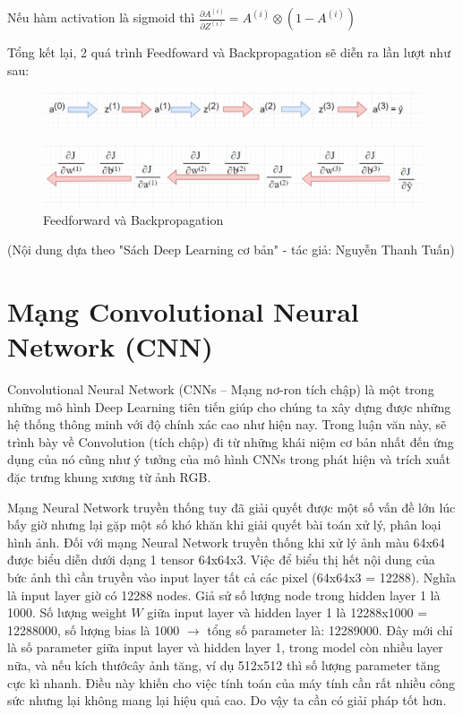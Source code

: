 Nếu hàm activation là sigmoid thì $\frac{\partial A^{(i)}}{\partial Z^{(i)}} = A^{(i)} \otimes (1-A^{(i)})$

Tổng kết lại, 2 quá trình Feedfoward và Backpropagation sẽ diễn ra lần lượt như sau:


\begin{figure}[htp]
\begin{center}
\includegraphics[scale=0.7]{chap2/c2_figs/7.png}
\end{center}
\end{figure}



\begin{figure}[htp]
\begin{center}
\includegraphics[scale=0.65]{chap2/c2_figs/8.png}
\end{center}
\caption{Feedforward và Backpropagation}
\label{fig:backpropagation}
\end{figure}


(Nội dung dựa theo "Sách Deep Learning cơ bản" - tác giả: Nguyễn Thanh Tuấn)

\section{Mạng Convolutional Neural Network (CNN)}
Convolutional Neural Network (CNNs – Mạng nơ-ron tích chập) là một trong những mô hình Deep Learning tiên tiến giúp cho chúng ta xây dựng được những hệ thống thông minh với độ chính xác cao như hiện nay. Trong luận văn này, sẽ trình bày về Convolution (tích chập) đi từ những khái niệm cơ bản nhất đến ứng dụng của nó cũng như ý tưởng của mô hình CNNs trong phát hiện và trích xuất đặc trưng khung xương từ ảnh RGB.

Mạng Neural Network truyền thống tuy đã giải quyết  được một số vấn đề lớn lúc bấy giờ nhưng lại gặp một số khó khăn khi giải quyết bài toán xử lý, phân loại hình ảnh.
Đối với mạng Neural Network truyền thống khi xử lý ảnh màu 64x64 được biểu diễn dưới dạng 1 tensor 64x64x3. Việc để biểu thị hết nội dung của bức ảnh thì cần truyền vào input layer tất cả các pixel (64x64x3 = 12288). Nghĩa là input layer giờ có 12288 nodes. Giả sử số lượng node trong hidden layer 1 là 1000. Số lượng weight $W$ giữa input layer và hidden layer 1 là 12288x1000 = 12288000, số lượng bias là 1000 $\rightarrow$ tổng số parameter là: 12289000. Đây mới chỉ là số parameter giữa input layer và hidden layer 1, trong model còn nhiều layer nữa, và nếu kích thướcây ảnh tăng, ví dụ 512x512 thì số lượng parameter tăng cực kì nhanh. Điều này khiến cho việc tính toán của máy tính cần rất nhiều công sức nhưng lại không mang lại hiệu quả cao. Do vậy ta cần có giải pháp tốt hơn.


